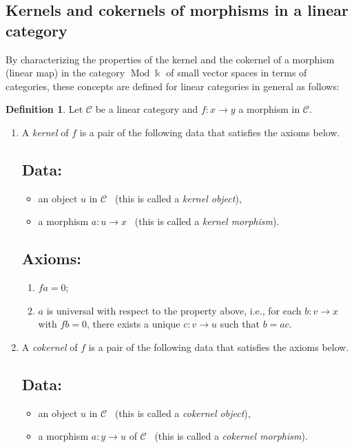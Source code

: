 \documentclass{surv-l}
\numberwithin{equation}{chapter}
\numberwithin{figure}{chapter}
\theoremstyle{plain}
\theoremstyle{definition}
\newtheorem{dfn}[thm]{Definition}
\theoremstyle{remark}
\DeclareMathOperator{\Mod}{Mod}
\begin{document}
\subsection{Kernels and cokernels of morphisms in a linear category}

By characterizing the properties of the kernel and the cokernel of a morphism (linear map) in the category $\Mod \Bbbk$ of small vector spaces in terms of categories,
these concepts are defined for linear categories in general as follows:

\begin{dfn}\label{dfn:ker-coker}
Let ${\mathcal{C}}$ be a linear category and $f \colon x \to y$ a morphism in ${\mathcal{C}}$.
\begin{enumerate}
\item
A \emph{kernel} of $f$ is a pair of the following data that satisfies the axioms below.

\subsection*{Data:}
\begin{itemize}
\item
an object $u$ in ${\mathcal{C}}$ \ (this is called a {\em kernel
  object}),
\item
a morphism $a \colon u \to x$ \ (this is called a {\em kernel
  morphism}).
\end{itemize}

\subsection*{Axioms:}
\begin{enumerate}
\item
$fa = 0$;
\item
$a$ is universal with respect to the property above, i.e.,
for each $b \colon v \to x$ with $fb = 0$, there exists a unique $c \colon v \to u$
such that $b = ac$.
\end{enumerate}
\item
A \emph{cokernel} of $f$ is a pair of the following data that satisfies the axioms below.

\subsection*{Data:}
\begin{itemize}
\item
an object $u$ in ${\mathcal{C}}$ \ (this is called a {\em cokernel
  object}),
\item
a morphism $a \colon y \to u$ of ${\mathcal{C}}$ \ (this is called a {\em
  cokernel morphism}).
\end{itemize}


\end{enumerate}
\end{dfn}
\end{document}
